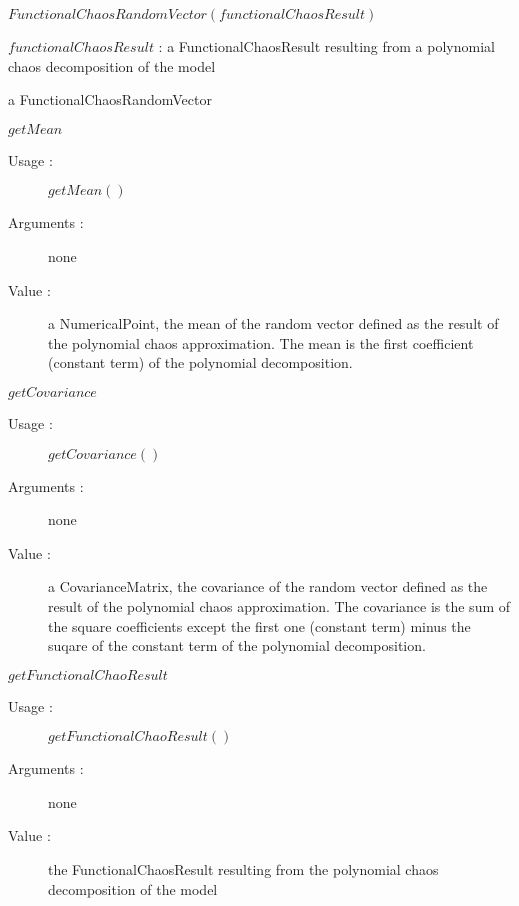 \begin{description}

\item[Usage :]   $FunctionalChaosRandomVector(functionalChaosResult)$

\item[Arguments :]  $functionalChaosResult$ : a FunctionalChaosResult resulting from a polynomial chaos decomposition of the model


\item[Value :]  a FunctionalChaosRandomVector


\item[Some methods :]  \rule{0pt}{1em}
  \begin{description}


  \item $getMean$
    \begin{description}
    \item[Usage :] $getMean()$
    \item[Arguments :] none
    \item[Value :] a NumericalPoint, the mean of the random vector defined as the result of the polynomial chaos approximation. The mean is the first coefficient (constant term) of the polynomial decomposition.
    \end{description}
    \bigskip

  \item $getCovariance$
    \begin{description}
    \item[Usage :] $getCovariance()$
    \item[Arguments :] none
    \item[Value :] a CovarianceMatrix, the covariance of the random vector defined as the result of the polynomial chaos approximation. The covariance is the sum of the square coefficients except the first one (constant term) minus the suqare of the constant term of the polynomial decomposition.
    \end{description}
    \bigskip

  \item $getFunctionalChaoResult$
    \begin{description}
    \item[Usage :] $getFunctionalChaoResult()$
    \item[Arguments :] none
    \item[Value :] the FunctionalChaosResult resulting from the polynomial chaos decomposition of the model
    \end{description}
    \bigskip


\end{description}
\end{description}
